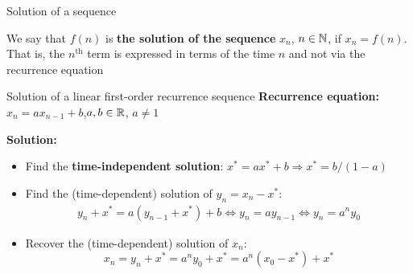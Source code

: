 \documentclass[9pt]{beamer}
\begin{document}
\begin{frame}{Solution of a sequence}

    We say that $f(n)$ is \textbf{the solution of the sequence} $x_n$, $n\in\mathbb{N}$, if $x_n = f(n)$. That is, the $n^{\text{th}}$ term is expressed in terms of the time $n$ and not via the recurrence equation

    \begin{block}{Solution of a linear first-order recurrence sequence}
        \textbf{Recurrence equation:} $x_n = a x_{n-1} + b$,\quad $a, b \in \mathbb{R}$, $a\neq 1$ \\
        \vspace{0.2cm}
        
        \textbf{Solution:}
        \vspace{-0.2cm}
        
        \begin{itemize}[leftmargin = 0.5cm, label = $\bullet$, rightmargin = 0.2cm]
            \item Find the \textbf{time-independent solution}: $x^* = a x^* + b \Rightarrow x^* = b/(1-a)$
            \item Find the (time-dependent) solution of $y_n = x_n - x^*$:
            \begin{align*}
                y_n + x^* = a(y_{n-1} + x^*) + b \Longleftrightarrow y_n = ay_{n-1} \Longleftrightarrow y_n = a^n y_0
            \end{align*}
            \item Recover the (time-dependent) solution of $x_n$:
            $$
            x_n = y_n + x^* = a^ny_0 + x^* = a^n(x_0 - x^*) + x^*
            $$
        \end{itemize}
    \end{block}
    
\end{frame}
\end{document}
